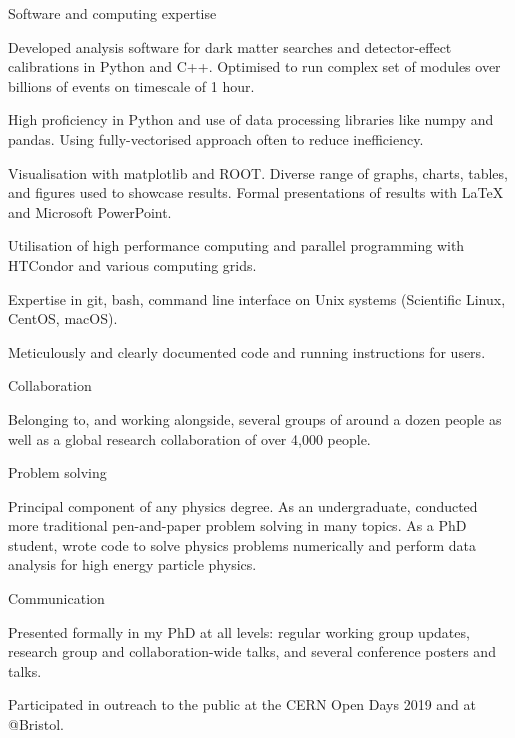
\begin{cventries}
    \cventry
    {} %
    {Software and computing expertise} %
    {} %
    {} %
    {
      \begin{cvitems}
        \item {Developed analysis software for dark matter searches and detector-effect calibrations in Python and C++. Optimised to run complex set of modules over billions of events on timescale of 1 hour.}
        \item {High proficiency in Python and use of data processing libraries like numpy and pandas. Using fully-vectorised approach often to reduce inefficiency.}
        \item {Visualisation with matplotlib and ROOT. Diverse range of graphs, charts, tables, and figures used to showcase results. Formal presentations of results with LaTeX and Microsoft PowerPoint.}
        \item {Utilisation of high performance computing and parallel programming with HTCondor and various computing grids.}
        \item{Expertise in git, bash, command line interface on Unix systems (Scientific Linux, CentOS, macOS).}
        \item {Meticulously and clearly documented code and running instructions for users.}
        \end{cvitems}
    }

    \cventry
    {}
    {Collaboration}
    {}
    {}
    {
      \begin{cvitems}
        \item {Belonging to, and working alongside, several groups of around a dozen people as well as a global research collaboration of over 4,000 people.}
        \end{cvitems}
    }

    \cventry
    {}
    {Problem solving}
    {}
    {}
    {
      \begin{cvitems}
        \item {Principal component of any physics degree. As an undergraduate, conducted more traditional pen-and-paper problem solving in many topics. As a PhD student, wrote code to solve physics problems numerically and perform data analysis for high energy particle physics.}
        \end{cvitems}
    }

    \cventry
    {}
    {Communication}
    {}
    {}
    {
      \begin{cvitems}
        \item {Presented formally in my PhD at all levels: regular working group updates, research group and collaboration-wide talks, and several conference posters and talks.}
        \item {Participated in outreach to the public at the CERN Open Days 2019 and at @Bristol.}
        \end{cvitems}
    }

\end{cventries}
